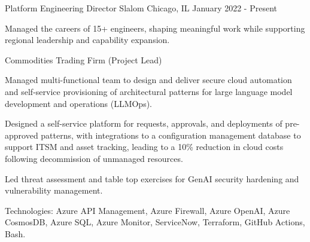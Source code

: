 

\begin{cventries}

  \cventry
    {Platform Engineering Director} %
    {Slalom} %
    {Chicago, IL} %
    {January 2022 - Present} %
    {
      \begin{cvitems} %
        \item {Managed the careers of 15+ engineers, shaping meaningful work while supporting regional leadership and capability expansion.}
      \end{cvitems}
    }

  \cventry
    {Commodities Trading Firm (Project Lead)} %
    {} %
    {} %
    {} %
    {
      \begin{cvitems} %
        \item {Managed multi-functional team to design and deliver secure cloud automation and self-service provisioning of architectural patterns for large language model development and operations (LLMOps).}
        \item {Designed a self-service platform for requests, approvals, and deployments of pre-approved patterns, with integrations to a configuration management database to support ITSM and asset tracking, leading to a 10\% reduction in cloud costs following decommission of unmanaged resources.}
        \item {Led threat assessment and table top exercises for GenAI security hardening and vulnerability management.}
        \item {Technologies: Azure API Management, Azure Firewall, Azure OpenAI, Azure CosmosDB, Azure SQL, Azure Monitor, ServiceNow, Terraform, GitHub Actions, Bash.}
      \end{cvitems}
    }


\end{cventries}
